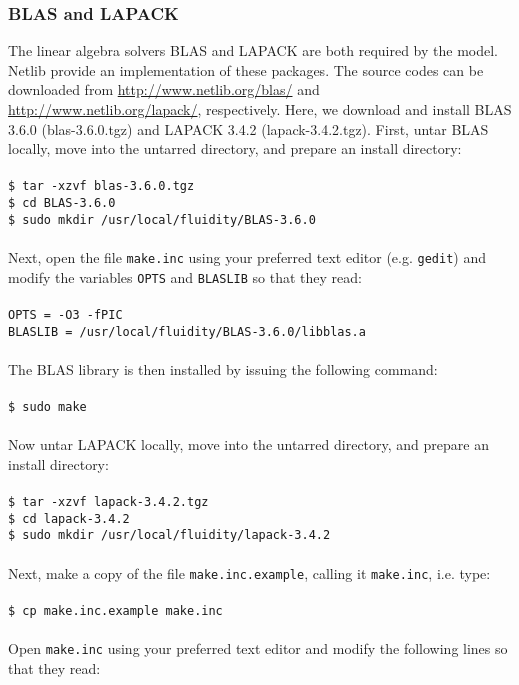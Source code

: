 \documentclass[10pt,a4paper]{article}
\newcommand\tab[1][0.5cm]{\hspace*{#1}}
\begin{document}
\subsubsection{BLAS and LAPACK}
The linear algebra solvers BLAS and LAPACK are both required by the model. Netlib provide an implementation of these packages. The source codes can be downloaded from \url{http://www.netlib.org/blas/} and \url{http://www.netlib.org/lapack/}, respectively. Here, we download and install BLAS 3.6.0 (blas-3.6.0.tgz) and LAPACK 3.4.2 (lapack-3.4.2.tgz). First, untar BLAS locally, move into the untarred directory, and prepare an install directory:\\\\
\tab \texttt{\$ tar -xzvf blas-3.6.0.tgz}\\
\tab \texttt{\$ cd BLAS-3.6.0}\\
\tab \texttt{\$ sudo mkdir /usr/local/fluidity/BLAS-3.6.0}\\\\
Next, open the file \texttt{make.inc} using your preferred text editor (e.g. \texttt{gedit}) and modify the variables \texttt{OPTS} and \texttt{BLASLIB} so that they read:\\\\
\tab \texttt{OPTS = -O3 -fPIC}\\
\tab \texttt{BLASLIB = /usr/local/fluidity/BLAS-3.6.0/libblas.a}\\\\
The BLAS library is then installed by issuing the following command:\\\\
\tab \texttt{\$ sudo make}\\\\
Now untar LAPACK locally, move into the untarred directory, and prepare an install directory:\\\\
\tab \texttt{\$ tar -xzvf lapack-3.4.2.tgz}\\
\tab \texttt{\$ cd lapack-3.4.2}\\
\tab \texttt{\$ sudo mkdir /usr/local/fluidity/lapack-3.4.2}\\\\
Next, make a copy of the file \texttt{make.inc.example}, calling it \texttt{make.inc}, i.e. type:\\\\
\tab \texttt{\$ cp make.inc.example make.inc}\\\\
Open \texttt{make.inc} using your preferred text editor and modify the following lines so that they read:\\\\
\end{document}
